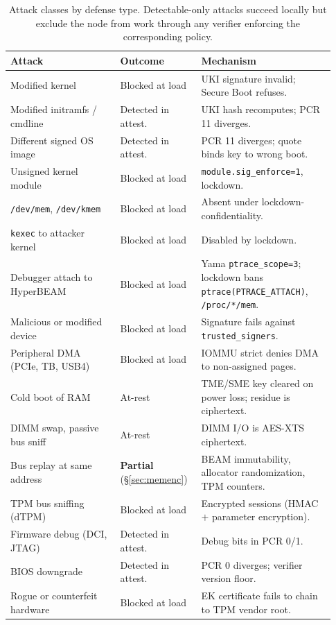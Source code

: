 \documentclass[10pt,a4paper]{article}
\begin{document}
\begin{table}[ht]
\centering
\footnotesize
\begin{tabular}{@{}p{0.32\linewidth} p{0.22\linewidth} p{0.39\linewidth}@{}}
\toprule
\textbf{Attack} & \textbf{Outcome} & \textbf{Mechanism} \\
\midrule
Modified kernel                  & Blocked at load   & UKI signature invalid; Secure Boot refuses. \\
Modified initramfs / cmdline     & Detected in attest.& UKI hash recomputes; PCR 11 diverges. \\
Different signed OS image        & Detected in attest.& PCR 11 diverges; quote binds key to wrong boot. \\
Unsigned kernel module           & Blocked at load   & \texttt{module.sig\_enforce=1}, lockdown. \\
\texttt{/dev/mem}, \texttt{/dev/kmem} & Blocked at load & Absent under lockdown-confidentiality. \\
\texttt{kexec} to attacker kernel & Blocked at load  & Disabled by lockdown. \\
Debugger attach to HyperBEAM     & Blocked at load   & Yama \texttt{ptrace\_scope=3}; lockdown bans \texttt{ptrace(PTRACE\_ATTACH)}, \texttt{/proc/*/mem}. \\
Malicious or modified device     & Blocked at load   & Signature fails against \texttt{trusted\_signers}. \\
Peripheral DMA (PCIe, TB, USB4)  & Blocked at load   & IOMMU strict denies DMA to non-assigned pages. \\
Cold boot of RAM                 & At-rest            & TME/SME key cleared on power loss; residue is ciphertext. \\
DIMM swap, passive bus sniff     & At-rest            & DIMM I/O is AES-XTS ciphertext. \\
Bus replay at same address       & \textbf{Partial} (\S\ref{sec:memenc}) & BEAM immutability, allocator randomization, TPM counters. \\
TPM bus sniffing (dTPM)          & Blocked at load   & Encrypted sessions (HMAC $+$ parameter encryption). \\
Firmware debug (DCI, JTAG)       & Detected in attest.& Debug bits in PCR 0/1. \\
BIOS downgrade                   & Detected in attest.& PCR 0 diverges; verifier version floor. \\
Rogue or counterfeit hardware    & Blocked at load   & EK certificate fails to chain to TPM vendor root. \\
\bottomrule
\end{tabular}
\vspace{-0.3em}
\caption{Attack classes by defense type. Detectable-only attacks succeed
locally but exclude the node from work through any verifier enforcing the
corresponding policy.}
\label{tab:attacks}
\vspace{-0.5em}
\end{table}
\end{document}
